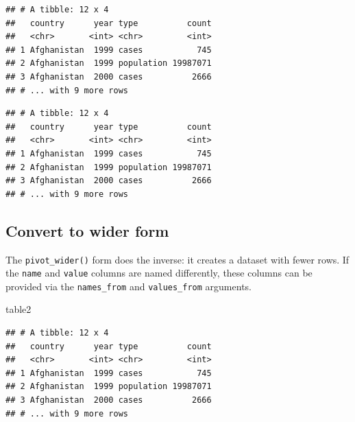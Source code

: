 \documentclass[]{book}
\newenvironment{Shaded}{}{}
\newcommand{\DataTypeTok}[1]{#1}
\newcommand{\KeywordTok}[1]{\textcolor[rgb]{0.00,0.00,1.00}{#1}}
\newcommand{\NormalTok}[1]{#1}
\newcommand{\OperatorTok}[1]{#1}
\newcommand{\StringTok}[1]{\textcolor[rgb]{0.00,0.50,0.50}{#1}}
\begin{document}
\begin{verbatim}
## # A tibble: 12 x 4
##   country      year type          count
##   <chr>       <int> <chr>         <int>
## 1 Afghanistan  1999 cases           745
## 2 Afghanistan  1999 population 19987071
## 3 Afghanistan  2000 cases          2666
## # ... with 9 more rows
\end{verbatim}

\begin{Shaded}
\end{Shaded}

\begin{verbatim}
## # A tibble: 12 x 4
##   country      year type          count
##   <chr>       <int> <chr>         <int>
## 1 Afghanistan  1999 cases           745
## 2 Afghanistan  1999 population 19987071
## 3 Afghanistan  2000 cases          2666
## # ... with 9 more rows
\end{verbatim}

\hypertarget{convert-to-wider-form}{%
\subsection{Convert to wider form}\label{convert-to-wider-form}}

The \texttt{pivot\_wider()} form does the inverse: it creates a dataset with fewer rows.
If the \texttt{name} and \texttt{value} columns are named differently, these columns can be provided via the \texttt{names\_from} and \texttt{values\_from} arguments.

\begin{Shaded}
\begin{Highlighting}[]
\NormalTok{table2}
\end{Highlighting}
\end{Shaded}

\begin{verbatim}
## # A tibble: 12 x 4
##   country      year type          count
##   <chr>       <int> <chr>         <int>
## 1 Afghanistan  1999 cases           745
## 2 Afghanistan  1999 population 19987071
## 3 Afghanistan  2000 cases          2666
## # ... with 9 more rows
\end{verbatim}
\end{document}
